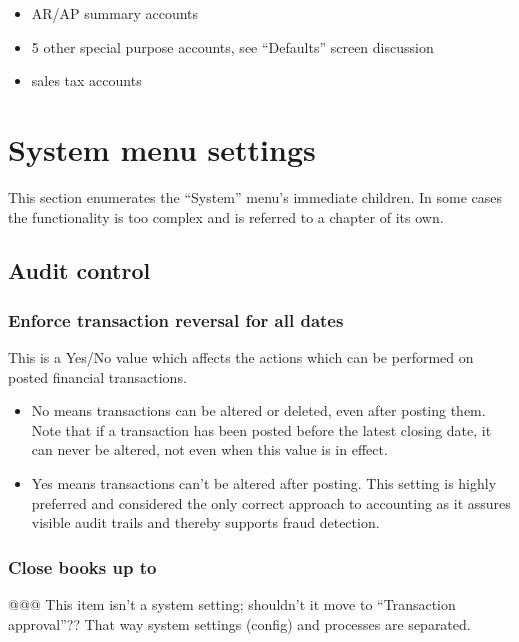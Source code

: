 \begin{itemize}
\item AR/AP summary accounts
\item 5 other special purpose accounts, see ``Defaults'' screen discussion
\item sales tax accounts
\end{itemize}


\section{System menu settings}
\label{sec-company-config-system-menu}

This section enumerates the ``System'' menu's immediate children. In some cases the
functionality is too complex and is referred to a chapter of its own.

\subsection{Audit control}
\label{subsec-company-config-audit-control}

\subsubsection{Enforce transaction reversal for all dates}
\label{subsubsec-company-config-audit-control-reversals}


This is a Yes/No value which affects the actions which can be performed on posted financial transactions.
\begin{itemize}
\item No means transactions can be altered or deleted, even after posting them. Note that
if a transaction has been posted before the latest closing date, it can never be altered,
not even when this value is in effect.
\item Yes means transactions can't be altered after posting. This setting is highly preferred and considered the only correct approach to accounting as it assures visible
audit trails and thereby supports fraud detection.
\end{itemize}

\subsubsection{Close books up to}
\label{subsubsec-company-config-audit-control-close-books}


@@@ This item isn't a system setting; shouldn't it move to ``Transaction approval''?? That way system settings (config) and processes are separated.


